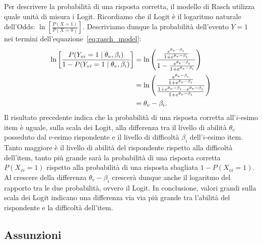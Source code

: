 Per descrivere la probabilità di una risposta corretta, il modello di Rasch utilizza quale unità di misura i Logit. 
Ricordiamo che il Logit è il logaritmo naturale dell'Odds: $\ln \left[\frac{P(X=1)}{P(X=0)}\right]$. 
Descriviamo dunque la probabilità dell'evento $Y=1$ nei termini dell'equazione~\ref{eq:rasch_model}: 
\begin{align}
\ln \left[\frac{P(Y_{vi} = 1 \mid  \theta_v, \beta_i)}{1-P(Y_{vi} = 1 \mid \theta_v, \beta_i)} \right] &= \ln \left( \frac{ \frac{e^{\theta_v-\beta_i}}{1+e^{\theta_v-\beta_i}} }{ 1- \frac{e^{\theta_v-\beta_i}}{1+e^{\theta_v-\beta_i}}} \right)  \notag\\ 
&= \ln \left( \frac{ \frac{e^{\theta_v-\beta_i}}{1+e^{\theta_v-\beta_i}} }{  \frac{ 1+ e^{\theta_v-\beta_i} - e^{\theta_v-\beta_i}}{1+e^{\theta_v-\beta_i}}  } \right)\notag\\
&= \theta_v-\beta_i.
\label{eq:rasch_logit}
\end{align}
Il risultato precedente indica che la probabilità di una risposta corretta all'$i$-esimo item è uguale, sulla scala dei Logit, alla differenza tra il livello di abilità $\theta_v$ posseduto dal $v$-esimo rispondente e il livello di difficoltà $\beta_i$ dell'$i$-esimo item. 
Tanto maggiore è il livello di abilità del rispondente rispetto alla difficoltà dell'item, tanto più grande sarà la probabilità di una risposta corretta $P(X_{vi} = 1)$ rispetto alla probabilità di una risposta sbagliata $1-P(X_{vi} = 1)$.
Al crescere della differenza $\theta_v-\beta_i$ crescerà dunque anche il logaritmo del rapporto tra le due probabilità, ovvero il Logit.
In conclusione, valori grandi sulla scala dei Logit indicano una differenza via via più grande tra l'abilità del rispondente e la difficoltà dell'item.

\subsection{Assunzioni}

